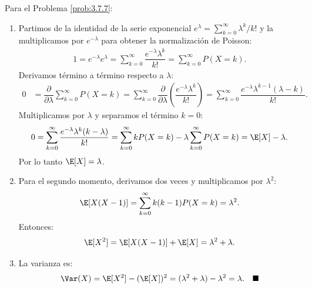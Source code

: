 \begin{solucion}
	\label{sol:3.7.7}
	Para el Problema \ref{prob:3.7.7}:
	\begin{enumerate}
		\item Partimos de la identidad de la serie exponencial $e^{\lambda} = \sum_{k=0}^{\infty} \lambda^{k}/k!$ y la multiplicamos por $e^{-\lambda}$ para obtener la normalización de Poisson:
		\begin{align*}
			1 = e^{-\lambda} e^{\lambda} = \sum_{k=0}^{\infty} \dfrac{e^{-\lambda} \lambda^{k}}{k!} = \sum_{k=0}^{\infty} P(X = k).
		\end{align*}
		Derivamos término a término respecto a $\lambda$:
		\begin{align*}
			0 &= \dfrac{\partial}{\partial \lambda} \sum_{k=0}^{\infty} P(X = k) = \sum_{k=0}^{\infty} \dfrac{\partial}{\partial \lambda}\left(\dfrac{e^{-\lambda} \lambda^{k}}{k!}\right) = \sum_{k=0}^{\infty} \dfrac{e^{-\lambda} \lambda^{k-1}(\lambda - k)}{k!}.
		\end{align*}
		Multiplicamos por $\lambda$ y separamos el término $k = 0$:
		\begin{align*}
			0 = \sum_{k=0}^{\infty} \dfrac{e^{-\lambda} \lambda^{k}(k - \lambda)}{k!} = \sum_{k=0}^{\infty} k P(X = k) - \lambda \sum_{k=0}^{\infty} P(X = k) = \E[X] - \lambda.
		\end{align*}
		Por lo tanto $\E[X] = \lambda$.
		\item Para el segundo momento, derivamos dos veces y multiplicamos por $\lambda^{2}$:
		\begin{align*}
			\E[X(X-1)] = \sum_{k=0}^{\infty} k(k-1) P(X = k) = \lambda^{2}.
		\end{align*}
		Entonces:
		\begin{align*}
			\E[X^{2}] = \E[X(X-1)] + \E[X] = \lambda^{2} + \lambda.
		\end{align*}
		\item La varianza es:
		\begin{align*}
			\Var(X) = \E[X^{2}] - (\E[X])^{2} = (\lambda^{2} + \lambda) - \lambda^{2} = \lambda. \quad \blacksquare
		\end{align*}
	\end{enumerate}
\end{solucion}

